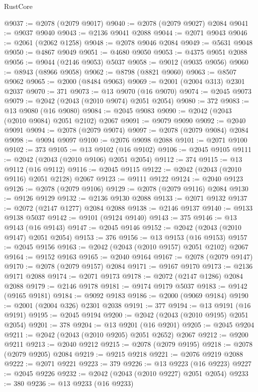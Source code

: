 \begin{lexlean}{RustCore}
\begin{coremodule}
@9037 := @2078 (@2079 @9017)
@9040 := @2078 (@2079 @9027) @2084
@9041 := @9037 @9040
@9043 := @2136 @9041 @2088
@9044 := @2071 @9043
@9046 := @2061 (@2062 @1258)
@9048 := @2078 @9046 @2084
@9049 := @5631 @9048
@9050 := @4867 @9049
@9051 := @4680 @9050
@9053 := @4375 @9051 @2088
@9056 := @9044 (@2146 @9053) @5037
@9058 := @9012 (@9035 @9056)
@9060 := @8943 (@8966 @9058)
@9062 := @8798 (@8821 @9060)
@9063 := @8507 @9062
@9065 := @2000 (@8484 @9063)
@9069 := @2001 (@2004 @313) @2301 @2037
@9070 := 371
@9073 := @13 @9070 (@16 @9070)
@9074 := @2045 @9073
@9079 := @2042 (@2043 (@2010 @9074) @2051 @2054)
@9080 := 372
@9083 := @13 @9080 (@16 @9080)
@9084 := @2045 @9083
@9090 := @2042 (@2043 (@2010 @9084) @2051 @2102) @2067
@9091 := @9079 @9090
@9092 := @2040 @9091
@9094 := @2078 (@2079 @9074)
@9097 := @2078 (@2079 @9084) @2084
@9098 := @9094 @9097
@9100 := @2076 @9098 @2088
@9101 := @2071 @9100
@9102 := 373
@9105 := @13 @9102 (@16 @9102)
@9106 := @2045 @9105
@9111 := @2042 (@2043 (@2010 @9106) @2051 @2054)
@9112 := 374
@9115 := @13 @9112 (@16 @9112)
@9116 := @2045 @9115
@9122 := @2042 (@2043 (@2010 @9116) @2051 @2128) @2067
@9123 := @9111 @9122
@9124 := @2040 @9123
@9126 := @2078 (@2079 @9106)
@9129 := @2078 (@2079 @9116) @2084
@9130 := @9126 @9129
@9132 := @2136 @9130 @2088
@9133 := @2071 @9132
@9137 := @2072 (@2147 @1277) @2084 @2088
@9138 := @2146 @9137
@9140 := @9133 @9138 @5037
@9142 := @9101 (@9124 @9140)
@9143 := 375
@9146 := @13 @9143 (@16 @9143)
@9147 := @2045 @9146
@9152 := @2042 (@2043 (@2010 @9147) @2051 @2054)
@9153 := 376
@9156 := @13 @9153 (@16 @9153)
@9157 := @2045 @9156
@9163 := @2042 (@2043 (@2010 @9157) @2051 @2102) @2067
@9164 := @9152 @9163
@9165 := @2040 @9164
@9167 := @2078 (@2079 @9147)
@9170 := @2078 (@2079 @9157) @2084
@9171 := @9167 @9170
@9173 := @2136 @9171 @2088
@9174 := @2071 @9173
@9178 := @2072 (@2147 @1286) @2084 @2088
@9179 := @2146 @9178
@9181 := @9174 @9179 @5037
@9183 := @9142 (@9165 @9181)
@9184 := @9092 @9183
@9186 := @2000 (@9069 @9184)
@9190 := @2001 (@2004 @326) @2301 @2038
@9191 := 377
@9194 := @13 @9191 (@16 @9191)
@9195 := @2045 @9194
@9200 := @2042 (@2043 (@2010 @9195) @2051 @2054)
@9201 := 378
@9204 := @13 @9201 (@16 @9201)
@9205 := @2045 @9204
@9211 := @2042 (@2043 (@2010 @9205) @2051 @2652) @2067
@9212 := @9200 @9211
@9213 := @2040 @9212
@9215 := @2078 (@2079 @9195)
@9218 := @2078 (@2079 @9205) @2084
@9219 := @9215 @9218
@9221 := @2076 @9219 @2088
@9222 := @2071 @9221
@9223 := 379
@9226 := @13 @9223 (@16 @9223)
@9227 := @2045 @9226
@9232 := @2042 (@2043 (@2010 @9227) @2051 @2054)
@9233 := 380
@9236 := @13 @9233 (@16 @9233)

\end{coremodule}
\end{lexlean}

